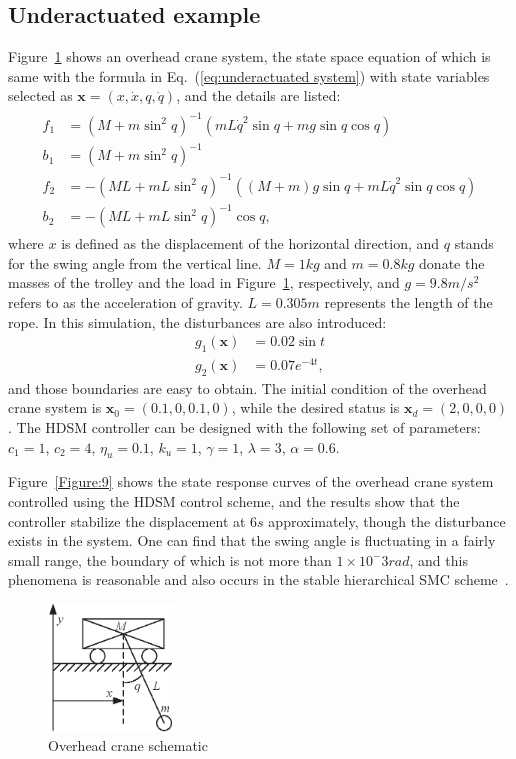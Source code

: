 \documentclass[3p]{elsarticle}
\theoremstyle{plain}
\theoremstyle{remark}
\begin{document}
\subsection{Underactuated example}
Figure~\ref{Figure:8} shows an overhead crane system, the state space equation of which is same with the formula in Eq.~(\ref{eq:underactuated system}) with state variables selected as $\bm x=(x,\dot x,q,\dot q)$, and the details are listed:
\begin{align}
\begin{split}
f_1&=(M+m\sin^2q)^{-1}(mL\dot q^2\sin q+mg\sin q\cos q)\\
b_1&=(M+m\sin^2q)^{-1}\\
f_2&=-(ML+mL\sin^2q)^{-1}((M+m)g\sin q+mL\dot q^2\sin q\cos q)\\
b_2&=-(ML+mL\sin^2q)^{-1}\cos q,
\end{split}
\end{align}
where $x$ is defined as the displacement of the horizontal direction, and $q$ stands for the swing angle from the vertical line. $M=1kg$ and $m=0.8kg$ donate the masses of the trolley and the load in Figure~\ref{Figure:8}, respectively, and $g=9.8m/s^2$ refers to as the acceleration of gravity. $L=0.305m$ represents the length of the rope. In this simulation, the disturbances are also introduced:
\begin{align}
g_1(\bm x)&= 0.02\sin t\\
g_2(\bm x)&=0.07e^{-4t},
\end{align}
and those boundaries are easy to obtain. The initial condition of the overhead crane system is $\bm x_0 = (0.1,0,0.1,0)$, while the desired status is $\bm x_d = (2,0,0,0)$. The HDSM controller can be designed with the following set of parameters:
$c_1=1$, $c_2=4$, $\eta_u = 0.1$, $k_u=1$, $\gamma = 1$, $\lambda = 3$, $\alpha = 0.6$.\par
Figure~\ref{Figure:9} shows the state response curves of the overhead crane system controlled using the HDSM control scheme, and the results show that the controller stabilize the displacement at $6s$ approximately, though the disturbance exists in the system. One can find that the swing angle is fluctuating in a fairly small range, the boundary of which is not more than $1\times 10^-3rad$, and this phenomena is reasonable and also occurs in the stable hierarchical SMC scheme~\cite{wang2004design}.
\begin{figure}
\centering
\includegraphics[width=0.3\textwidth]{paper3_fig8.eps}
\caption{Overhead crane schematic}
\label{Figure:8}
\end{figure}
\end{document}
